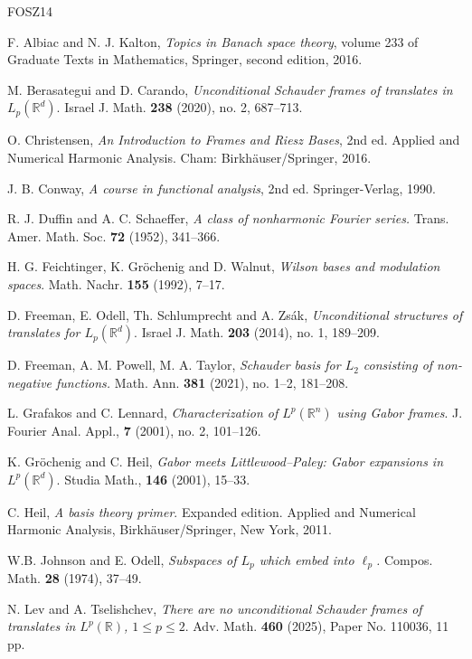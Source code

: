 \documentclass[reqno,a4paper,12pt]{amsart}
\numberwithin{equation}{section}
\numberwithin{figure}{section}
\newcommand\R{\mathbb{R}}
\newcommand\1{\mathds{1}}
\theoremstyle{plain}
\theoremstyle{definition}
\begin{document}
\begin{thebibliography}{FOSZ14}

 F. Albiac and N. J. Kalton, \emph{Topics in Banach space theory}, volume 233 of Graduate Texts in Mathematics, Springer, second edition, 2016.

 M. Berasategui and D. Carando, \emph{Unconditional Schauder frames of translates in $L_p(\mathbb{R}^d)$}.
Israel J. Math. \textbf{238} (2020), no. 2, 687--713.

O. Christensen, \emph{An Introduction to Frames and Riesz Bases}, 2nd ed. Applied and Numerical Harmonic Analysis. Cham: Birkhäuser/Springer, 2016.

J. B. Conway, 
\emph{A course in functional analysis},
2nd ed. Springer-Verlag, 1990.

R. J. Duffin and A. C. Schaeffer, 
\emph{A class of nonharmonic Fourier series.}
Trans. Amer. Math. Soc. \textbf{72} (1952), 341–366.

H. G. Feichtinger, K. Gröchenig and D. Walnut,
\emph{Wilson bases and modulation spaces}. Math. Nachr. \textbf{155} (1992), 7--17.

D. Freeman, E. Odell, Th. Schlumprecht and A. Zs\'ak, 
\emph{Unconditional structures of translates for $L_p(\mathbb{R}^d)$}.
Israel J. Math. \textbf{203} (2014), no. 1, 189--209.

D. Freeman, A. M. Powell, M. A. Taylor, 
\emph{Schauder basis for $L_2$ consisting of non-negative functions.}
Math. Ann. \textbf{381} (2021), no. 1--2, 181--208.

L. Grafakos and C. Lennard, \emph{Characterization of $L^p(\R^n)$ using Gabor frames}. J. Fourier Anal. Appl., \textbf{7} (2001), no. 2, 101--126.

K. Gr\"{o}chenig and C. Heil, \emph{Gabor meets Littlewood--Paley: Gabor expansions in $L^p(\R^d)$}. Studia Math., \textbf{146} (2001), 15--33.

C. Heil, \emph{A basis theory primer}. Expanded edition. Applied and Numerical Harmonic Analysis, Birkhäuser/Springer, New York, 2011.  

W.B. Johnson and E. Odell, 
\emph{Subspaces of $L_p$ which embed into $\ell_p$.} Compos. Math. \textbf{28} (1974), 37--49.

N. Lev and A. Tselishchev,
\emph{There are no unconditional Schauder frames of translates in $L^p(\mathbb R)$, $1 \leqslant p\leqslant 2$}.	Adv. Math. \textbf{460} (2025), Paper No. 110036, 11 pp.


\end{thebibliography}
\end{document}
